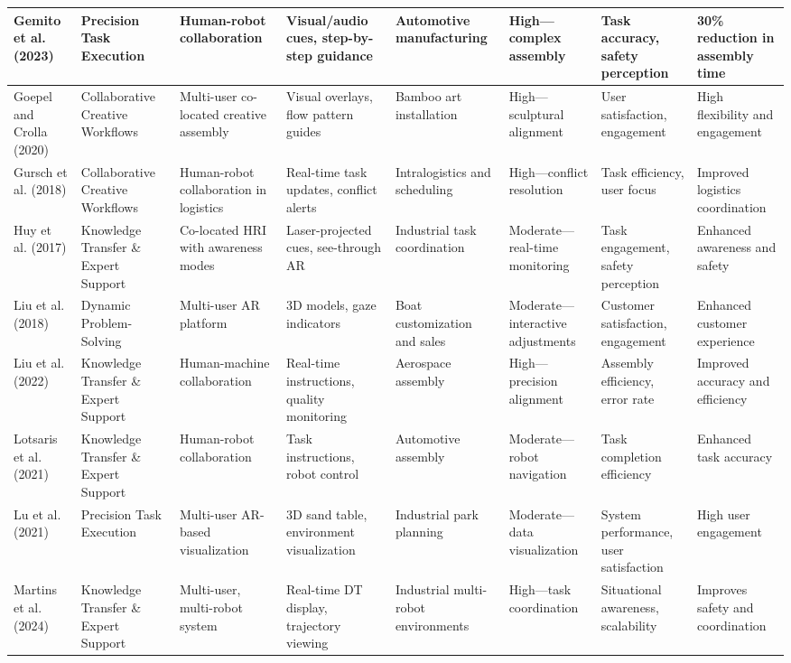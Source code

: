 {\begin{landscape}
\begin{longtable}{@{}p{1.8cm}p{1.8cm}p{1.8cm}p{1.8cm}p{1.8cm}p{1.8cm}p{1.8cm}p{1.8cm}@{}}
\midrule
Gemito et al. (2023) & Precision Task Execution & Human-robot collaboration & Visual/audio cues, step-by-step guidance & Automotive manufacturing & High—complex assembly & Task accuracy, safety perception & 30\% reduction in assembly time \\
\midrule
Goepel and Crolla (2020) & Collaborative Creative Workflows & Multi-user co-located creative assembly & Visual overlays, flow pattern guides & Bamboo art installation & High—sculptural alignment & User satisfaction, engagement & High flexibility and engagement \\
\midrule
Gursch et al. (2018) & Collaborative Creative Workflows & Human-robot collaboration in logistics & Real-time task updates, conflict alerts & Intralogistics and scheduling & High—conflict resolution & Task efficiency, user focus & Improved logistics coordination \\
\midrule
Huy et al. (2017) & Knowledge Transfer \& Expert Support & Co-located HRI with awareness modes & Laser-projected cues, see-through AR & Industrial task coordination & Moderate—real-time monitoring & Task engagement, safety perception & Enhanced awareness and safety \\
\midrule
Liu et al. (2018) & Dynamic Problem-Solving & Multi-user AR platform & 3D models, gaze indicators & Boat customization and sales & Moderate—interactive adjustments & Customer satisfaction, engagement & Enhanced customer experience \\
\midrule
Liu et al. (2022) & Knowledge Transfer \& Expert Support & Human-machine collaboration & Real-time instructions, quality monitoring & Aerospace assembly & High—precision alignment & Assembly efficiency, error rate & Improved accuracy and efficiency \\
\midrule
Lotsaris et al. (2021) & Knowledge Transfer \& Expert Support & Human-robot collaboration & Task instructions, robot control & Automotive assembly & Moderate—robot navigation & Task completion efficiency & Enhanced task accuracy \\
\midrule
Lu et al. (2021) & Precision Task Execution & Multi-user AR-based visualization & 3D sand table, environment visualization & Industrial park planning & Moderate—data visualization & System performance, user satisfaction & High user engagement \\
\midrule
Martins et al. (2024) & Knowledge Transfer \& Expert Support & Multi-user, multi-robot system & Real-time DT display, trajectory viewing & Industrial multi-robot environments & High—task coordination & Situational awareness, scalability & Improves safety and coordination \\

\end{longtable}
\end{landscape}}
